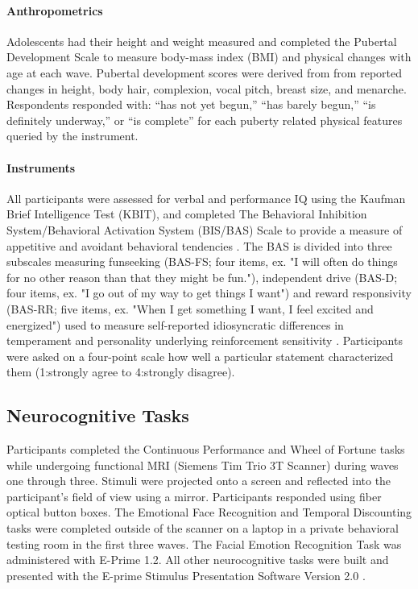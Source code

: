 \documentclass{article}%
\begin{document}
\paragraph*{Anthropometrics} Adolescents had their height and weight measured and completed the Pubertal Development Scale \citep{carskadon1993self} to measure body-mass index (BMI) and physical changes with age at each wave. Pubertal development scores were derived from from reported changes in height, body hair, complexion, vocal pitch, breast size, and menarche. Respondents responded with: “has not yet begun,” “has barely begun,” “is definitely underway,” or “is complete” for each puberty related physical features queried by the instrument. 
\paragraph*{Instruments} All participants were assessed for verbal and performance IQ using the Kaufman Brief Intelligence Test (KBIT), \citep{kaufman2004kaufman} and  completed The Behavioral Inhibition System/Behavioral Activation System (BIS/BAS) Scale  to provide a measure of appetitive and avoidant behavioral tendencies \citep{carver1994behavioral}. The BAS is divided into three subscales measuring funseeking (BAS-FS; four items, ex. "I will often do things for no other reason than that they might be fun."), independent drive (BAS-D; four items, ex. "I go out of my way to get things I want") and reward responsivity (BAS-RR; five items, ex. "When I get something I want, I feel excited and energized") used to measure self-reported idiosyncratic differences in temperament and personality underlying reinforcement sensitivity \citep{corr2004reinforcementsensitivity}. Participants were asked on a four-point scale how well a particular statement characterized them (1:strongly agree to 4:strongly disagree).
\subsection*{Neurocognitive Tasks}  Participants completed the Continuous Performance and Wheel of Fortune tasks while undergoing functional MRI (Siemens Tim Trio 3T Scanner) during waves one through three. Stimuli were projected onto a screen and reflected into the participant's field of view using a mirror. Participants responded using fiber optical button boxes. The Emotional Face Recognition and Temporal Discounting tasks were completed outside of the scanner on a laptop in a private behavioral testing room in the first three waves. The Facial Emotion Recognition Task was administered with E-Prime 1.2. All other neurocognitive tasks were built and presented with the E-prime Stimulus Presentation Software Version 2.0 \citep{schneider2002prime}. 
\end{document}
